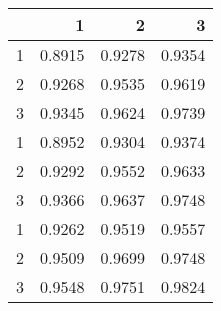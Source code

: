 \begin{tabular}{lrrr}
\toprule
{} &       1 &       2 &       3 \\
\midrule
1 &  0.8915 &  0.9278 &  0.9354 \\
2 &  0.9268 &  0.9535 &  0.9619 \\
3 &  0.9345 &  0.9624 &  0.9739 \\
1 &  0.8952 &  0.9304 &  0.9374 \\
2 &  0.9292 &  0.9552 &  0.9633 \\
3 &  0.9366 &  0.9637 &  0.9748 \\
1 &  0.9262 &  0.9519 &  0.9557 \\
2 &  0.9509 &  0.9699 &  0.9748 \\
3 &  0.9548 &  0.9751 &  0.9824 \\
\bottomrule
\end{tabular}
